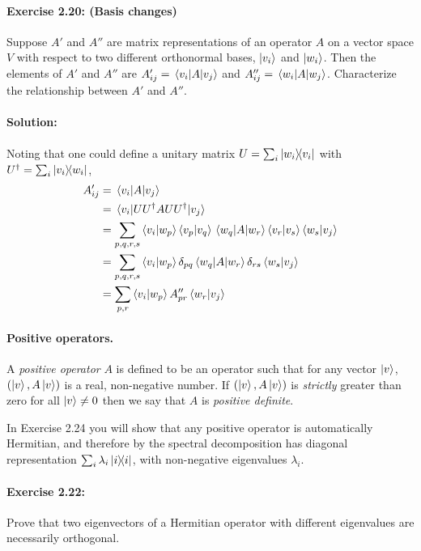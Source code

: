 \paragraph{\cite{mikeandike} Exercise 2.20: (Basis changes)} Suppose $A'$ and
$A''$ are matrix representations of an operator $A$ on a vector space $V$ with
respect to two different orthonormal bases, $\ket{v_i}$ and $\ket{w_i}$. Then
the elements of $A'$ and $A''$ are $A'_{ij} = \mel{v_i}{A}{v_j}$ and $A''_{ij}
= \mel{w_i}{A}{w_j}$. Characterize the relationship between $A'$ and $A''$.

\paragraph{Solution:} Noting that one could define a unitary matrix $U = \sum_i
\ketbra{w_i}{v_i}$ with $U^\dagger = \sum_i \ketbra{v_i}{w_i}$, \begin{align*}
  A'_{ij} &= \mel{v_i}{A}{v_j} \\
    &= \mel{v_i}{U U^\dagger A U U^\dagger}{v_j} \\
    &= \sum_{p,q,r,s} \braket{v_i}{w_p} \braket{v_p}{v_q} \mel{w_q}{A}{w_r}
      \braket{v_r}{v_s} \braket{w_s}{v_j} \\
    &= \sum_{p,q,r,s} \braket{v_i}{w_p} \delta_{pq} \mel{w_q}{A}{w_r}
      \delta_{rs} \braket{w_s}{v_j} \\
    &= \sum_{p,r} \braket{v_i}{w_p} A''_{pr} \braket{w_r}{v_j} \\
\end{align*}

\paragraph{Positive operators.} A \emph{positive operator} $A$ is defined to be
an operator such that for any vector $\ket{v}$, $(\ket{v}, A\ket{v})$ is a
real, non-negative number. If $(\ket{v}, A\ket{v})$ is \emph{strictly} greater
than zero for all $\ket{v} \neq 0$ then we say that $A$ is \emph{positive
definite}.

In Exercise 2.24 you will show that any positive operator is automatically
Hermitian, and therefore by the spectral decomposition has diagonal
representation $\sum_i \lambda_i \ketbra{i}{i}$, with non-negative eigenvalues
$\lambda_i$.

\paragraph{\cite{mikeandike} Exercise 2.22:} Prove that two eigenvectors of a
Hermitian operator with different eigenvalues are necessarily orthogonal.

